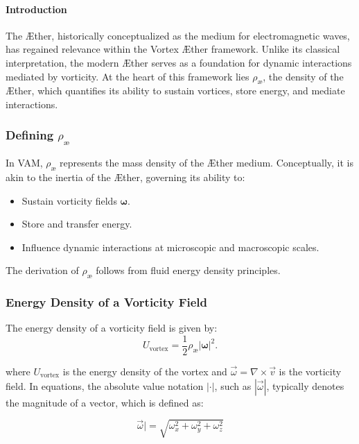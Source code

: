 \paragraph*{Introduction} The Æther, historically conceptualized as the medium for electromagnetic waves, has regained relevance within the Vortex Æther framework. Unlike its classical interpretation, the modern Æther serves as a foundation for dynamic interactions mediated by vorticity. At the heart of this framework lies $\rho_\text{\ae}$, the density of the Æther, which quantifies its ability to sustain vortices, store energy, and mediate interactions.

\subsubsection*{Defining $ \rho_\text{\ae} $}
In VAM, $ \rho_\text{\ae} $ represents the mass density of the Æther medium. Conceptually, it is akin to the inertia of the Æther, governing its ability to:

\begin{itemize}
    \item Sustain vorticity fields $ \mathbf{\omega} $.
    \item Store and transfer energy.
    \item Influence dynamic interactions at microscopic and macroscopic scales.
\end{itemize}
The derivation of $ \rho_\text{\ae} $ follows from fluid energy density principles.

\subsubsection*{Energy Density of a Vorticity Field}
The energy density of a vorticity field is given by:
\begin{equation*}
    U_{\text{vortex}} = \frac{1}{2} \rho_\text{\ae} |\mathbf{\omega}|^2.
\end{equation*}


where $U_{\text{vortex}}$ is the energy density of the vortex and $\vec{\omega} = \nabla \times \vec{v}$ is the vorticity field. In equations, the absolute value notation $| \cdot |$, such as $|\vec{\omega}|$, typically denotes the magnitude of a vector, which is defined as:

\begin{equation*}
    \vec{\omega}| = \sqrt{\omega_x^2 + \omega_y^2 + \omega_z^2}
\end{equation*}

